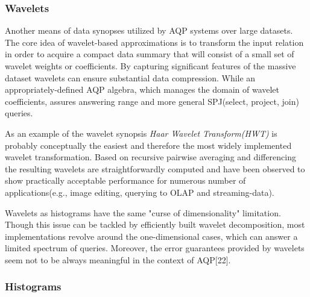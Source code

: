 \documentclass[10pt, conference, compsocconf]{IEEEtran}
\begin{document}
\subsubsection{\textbf{Wavelets}}

Another means of data synopses utilized by AQP systems over large datasets. The core idea of wavelet-based approximations is to transform the input relation in order to acquire a compact data summary that will consist of a small set of wavelet weights or coefficients. By capturing significant features of the massive dataset wavelets can ensure substantial data compression. While an appropriately-defined AQP algebra, which manages the domain of wavelet coefficients, assures answering range and more general SPJ(select, project, join) queries. 

As an example of the wavelet synopsis \textit{Haar Wavelet Transform(HWT)} is probably conceptually the easiest and therefore the most widely implemented wavelet transformation. Based on recursive pairwise averaging and differencing the resulting wavelets are straightforwardly computed and have been observed to show practically acceptable performance for numerous number of applications(e.g., image editing, querying to OLAP and streaming-data).

Wavelets as histograms have the same "curse of dimensionality" limitation. Though this issue can be tackled by efficiently built wavelet decomposition, most implementations revolve around the one-dimensional cases, which can answer a limited spectrum of queries. Moreover, the error guarantees provided by wavelets seem not to be always meaningful in the context of AQP[22]. \\


\subsubsection{\textbf{Histograms}}
\end{document}

